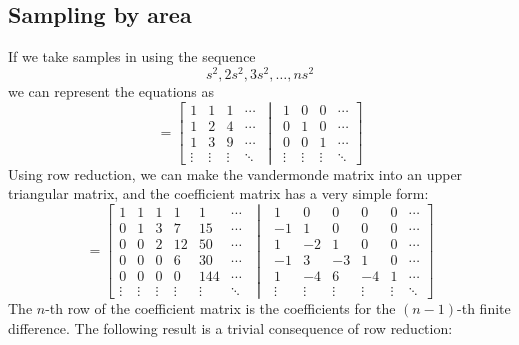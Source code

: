\documentclass{article}
\begin{document}
\subsection{Sampling by area}
If we take samples in using the sequence
\[s^2, 2s^2, 3s^2,\dots, ns^2\]
we can represent the equations as
\begin{equation}
	[S\vert I]=\left[ \begin{matrix}1 & 1 & 1 & \cdots \\ 1 & 2 & 4 & \cdots\\	1 & 3 & 9 & \cdots\\ \vdots & \vdots & \vdots & \ddots \end{matrix}\,\middle\vert\,\begin{matrix}1 & 0 & 0 & \cdots \\ 0 & 1 & 0 & \cdots \\ 0 & 0 & 1 & \cdots \\ \vdots & \vdots & \vdots & \ddots\end{matrix}\right]
\end{equation}
Using row reduction, we can make the vandermonde matrix into an upper triangular matrix, and the coefficient matrix has a very simple form:
\begin{equation}
	[T\vert C]=\left[\begin{matrix} 1 & 1 & 1 & 1 & 1 & \cdots \\
			0 & 1 & 3 & 7 & 15 &\cdots \\
			0 & 0 & 2 & 12 & 50 &\cdots \\
			0 & 0 & 0 & 6 & 30 & \cdots \\
			0 & 0 & 0 & 0 & 144 & \cdots \\
		\vdots & \vdots & \vdots & \vdots & \vdots & \ddots \end{matrix}
		\,\,\middle\vert\,\,\begin{matrix}
			1 & 0 & 0 & 0 & 0 & \cdots \\
			-1 & 1 & 0 & 0 & 0 & \cdots \\
			1 & -2 & 1 & 0 & 0 & \cdots \\
			-1 & 3 & -3 & 1 & 0 & \cdots \\
			1 & -4 & 6 & -4 & 1 & \cdots \\
			\vdots & \vdots & \vdots & \vdots & \vdots & \ddots
	\end{matrix}\right]
\end{equation}
The \(n\)-th row of the coefficient matrix is the coefficients for the \((n-1)\)-th finite difference.
The following result is a trivial consequence of row reduction:
\end{document}
